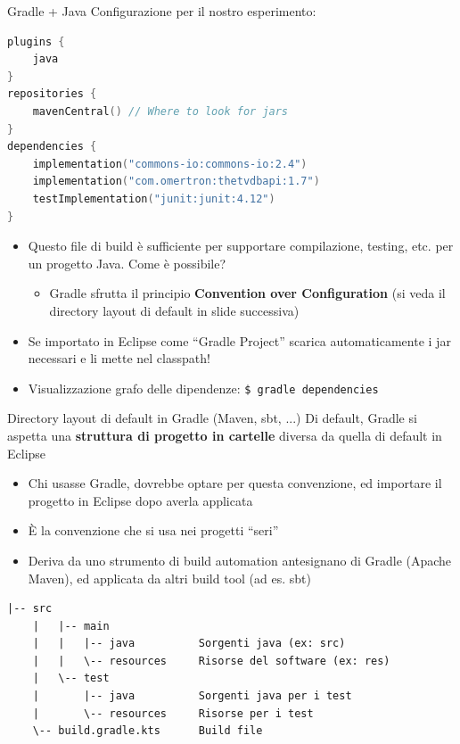 \documentclass[xcolor=dvipsnames,presentation]{beamer}
\begin{document}
\begin{frame}[fragile]{Gradle + Java}
Configurazione per il nostro esperimento:
\begin{block}{}
\begin{lstlisting}[language=kotlin,basicstyle=\tiny\ttfamily,columns=fullflexible]
plugins {
    java
}
repositories {
    mavenCentral() // Where to look for jars
}
dependencies {
    implementation("commons-io:commons-io:2.4")
    implementation("com.omertron:thetvdbapi:1.7")
    testImplementation("junit:junit:4.12")
}
\end{lstlisting}
\end{block}
\begin{itemize}
\item Questo file di build è sufficiente per supportare compilazione, testing, etc. per un progetto Java. Come è possibile?
	\begin{itemize}
		\item Gradle sfrutta il principio \textbf{Convention over Configuration} (si veda il directory layout di default in slide successiva)
	\end{itemize}

    \item Se importato in Eclipse come ``Gradle Project'' scarica automaticamente i jar necessari e li mette nel classpath!
    
    \item Visualizzazione grafo delle dipendenze: \texttt{\$ gradle dependencies}

\end{itemize}
\end{frame}

\begin{frame}[fragile]{Directory layout di default in Gradle (Maven, sbt, ...)}
    Di default, Gradle si aspetta una \textbf{struttura di progetto in cartelle} diversa da quella di default in Eclipse
    \begin{itemize}
        \item Chi usasse Gradle, dovrebbe optare per questa convenzione, ed importare il progetto in Eclipse dopo averla applicata
        \item È la convenzione che si usa nei progetti ``seri''
        \item Deriva da uno strumento di build automation antesignano di Gradle (Apache Maven), ed applicata da altri build tool (ad es. sbt)
    \end{itemize}
    \begin{lstlisting}[basicstyle=\tiny\ttfamily,columns=fullflexible]
    |-- src
    |   |-- main
    |   |   |-- java          Sorgenti java (ex: src)
    |   |   \-- resources     Risorse del software (ex: res)
    |   \-- test
    |       |-- java          Sorgenti java per i test
    |       \-- resources     Risorse per i test
    \-- build.gradle.kts      Build file
    \end{lstlisting}
\end{frame}
\end{document}
